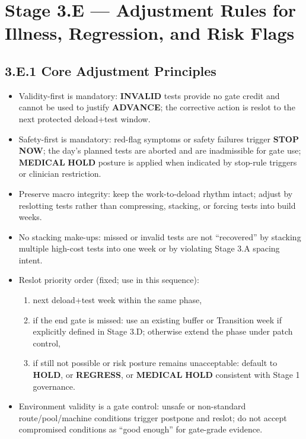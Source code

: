 \documentclass[10pt]{article}
\begin{document}
\section*{Stage 3.E — Adjustment Rules for Illness, Regression, and Risk Flags}
{}

\subsection*{3.E.1 Core Adjustment Principles}
{}

\begin{itemize}
\item Validity-first is mandatory: \textbf{INVALID} tests provide no gate credit and cannot be used to justify \textbf{ADVANCE}; the corrective action is reslot to the next protected deload+test window.
\item Safety-first is mandatory: red-flag symptoms or safety failures trigger \textbf{STOP} \textbf{NOW}; the day’s planned tests are aborted and are inadmissible for gate use; \textbf{MEDICAL} \textbf{HOLD} posture is applied when indicated by stop-rule triggers or clinician restriction.
\item Preserve macro integrity: keep the work-to-deload rhythm intact; adjust by reslotting tests rather than compressing, stacking, or forcing tests into build weeks.
\item No stacking make-ups: missed or invalid tests are not “recovered” by stacking multiple high-cost tests into one week or by violating Stage 3.A spacing intent.
\item Reslot priority order (fixed; use in this sequence):
\begin{enumerate}
\item next deload+test week within the same phase,
\item if the end gate is missed: use an existing buffer or Transition week if explicitly defined in Stage 3.D; otherwise extend the phase under patch control,
\item if still not possible or risk posture remains unacceptable: default to \textbf{HOLD}, or \textbf{REGRESS}, or \textbf{MEDICAL} \textbf{HOLD} consistent with Stage 1 governance.
\end{enumerate}
\item Environment validity is a gate control: unsafe or non-standard route/pool/machine conditions trigger postpone and reslot; do not accept compromised conditions as “good enough” for gate-grade evidence.

\end{itemize}
\end{document}
